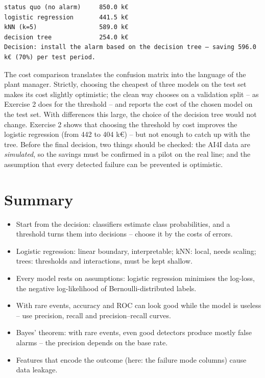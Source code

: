 \documentclass[
  letterpaper,
  DIV=11,
  numbers=noendperiod]{scrreprt}
\providecommand{\tightlist}{%
  \setlength{\itemsep}{0pt}\setlength{\parskip}{0pt}}\usepackage{longtable,booktabs,array}
\begin{document}
\begin{verbatim}
status quo (no alarm)     850.0 k€
logistic regression       441.5 k€
kNN (k=5)                 589.0 k€
decision tree             254.0 k€
Decision: install the alarm based on the decision tree – saving 596.0 k€ (70%) per test period.
\end{verbatim}

The cost comparison translates the confusion matrix into the language of
the plant manager. Strictly, choosing the cheapest of three models on
the test set makes its cost slightly optimistic; the clean way chooses
on a validation split -- as Exercise 2 does for the threshold -- and
reports the cost of the chosen model on the test set. With differences
this large, the choice of the decision tree would not change. Exercise 2
shows that choosing the threshold by cost improves the logistic
regression (from 442 to 404 k€) -- but not enough to catch up with the
tree. Before the final decision, two things should be checked: the AI4I
data are \emph{simulated}, so the savings must be confirmed in a pilot
on the real line; and the assumption that every detected failure can be
prevented is optimistic.

\section{Summary}\label{summary-7}

\begin{tcolorbox}[enhanced jigsaw, left=2mm, title=\textcolor{quarto-callout-important-color}{\faExclamation}\hspace{0.5em}{Key takeaways}, opacityback=0, breakable, rightrule=.15mm, arc=.35mm, toptitle=1mm, colbacktitle=quarto-callout-important-color!10!white, opacitybacktitle=0.6, coltitle=black, colframe=quarto-callout-important-color-frame, bottomrule=.15mm, leftrule=.75mm, bottomtitle=1mm, titlerule=0mm, toprule=.15mm, colback=white]

\begin{itemize}
\tightlist
\item
  Start from the decision: classifiers estimate class probabilities, and
  a threshold turns them into decisions -- choose it by the costs of
  errors.
\item
  Logistic regression: linear boundary, interpretable; kNN: local, needs
  scaling; trees: thresholds and interactions, must be kept shallow.
\item
  Every model rests on assumptions: logistic regression minimises the
  log-loss, the negative log-likelihood of Bernoulli-distributed labels.
\item
  With rare events, accuracy and ROC can look good while the model is
  useless -- use precision, recall and precision--recall curves.
\item
  Bayes' theorem: with rare events, even good detectors produce mostly
  false alarms -- the precision depends on the base rate.
\item
  Features that encode the outcome (here: the failure mode columns)
  cause data leakage.
\end{itemize}

\end{tcolorbox}
\end{document}
